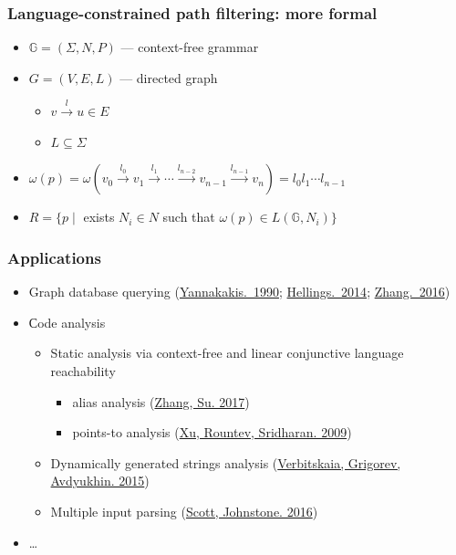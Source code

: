 \documentclass[xcolor=table]{beamer}
\begin{document}
\begin{frame}[fragile]
  \transwipe[direction=90]
  \frametitle{Language-constrained path filtering: more formal}
  \begin{itemize}
    \item $\mathbb{G} = (\Sigma, N, P)$ --- context-free grammar
    \item $G = (V,E,L)$ --- directed graph
      \begin{itemize} 
        \item $v \xrightarrow{l} u \in E$
        \item $L\subseteq \Sigma$
      \end{itemize}
    \item $\omega(p) = \omega(v_0 \xrightarrow{l_0} v_1 \xrightarrow{l_1} \cdots \xrightarrow{l_{n-2}} v_{n-1} \xrightarrow{l_{n-1}} v_n) = l_0 l_1 \cdots l_{n-1}$
    \item $R = \{ p \mid $ exists $ N_i \in N $ such that $ \omega(p) \in L(\mathbb{G},N_i)\}$
  \end{itemize}
\end{frame}

\begin{frame}[fragile]
  \transwipe[direction=90]
  \frametitle{Applications}
  \begin{itemize}
    \item Graph database querying (\href{http://dl.acm.org/citation.cfm?id=298576}{Yannakakis.~1990}; \href{https://uhdspace.uhasselt.be/dspace/handle/1942/16709}{Hellings.~2014}; \href{https://link.springer.com/chapter/10.1007/978-3-319-46523-4_38}{Zhang.~2016})
    \item Сode analysis
    \begin{itemize}
      \item Static analysis via context-free and linear conjunctive language reachability
        \begin{itemize}
          \item alias analysis (\href{https://dl.acm.org/citation.cfm?id=3009848}{Zhang, Su. 2017})
          \item points-to analysis (\href{https://link.springer.com/chapter/10.1007/978-3-642-03013-0_6}{Xu, Rountev, Sridharan. 2009})
        \end{itemize}
      \item Dynamically generated strings analysis (\href{https://link.springer.com/chapter/10.1007/978-3-319-41579-6\_22}{Verbitskaia, Grigorev, Avdyukhin. 2015})
      \item Multiple input parsing (\href{https://2016.splashcon.org/event/parsing2016-multiple-input-gll-parsing}{Scott, Johnstone. 2016})
    \end{itemize}
    \item \dots
  \end{itemize}
\end{frame}
\end{document}
